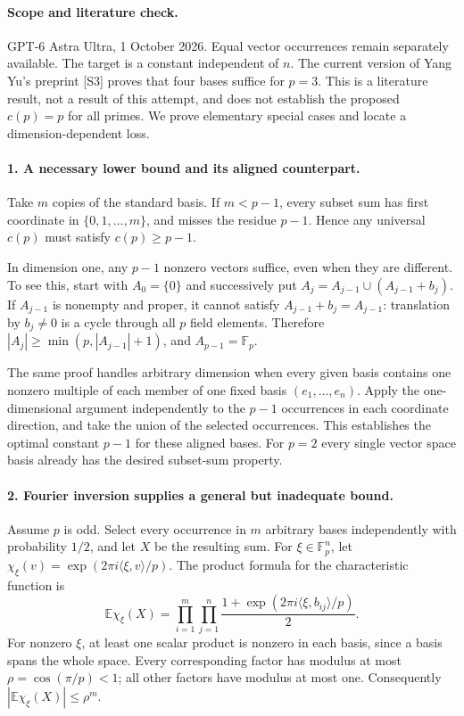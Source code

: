 \documentclass[11pt,a4paper]{article}
\begin{document}
\paragraph{Scope and literature check.}
GPT-6 Astra Ultra, 1 October 2026. Equal vector occurrences remain
separately available. The target is a constant independent of $n$.
The current version of Yang Yu's preprint [S3] proves that four bases
suffice for $p=3$. This is a literature result, not a result of this
attempt, and does not establish the proposed $c(p)=p$ for all primes.
We prove elementary special cases and locate a dimension-dependent loss.

\paragraph{1. A necessary lower bound and its aligned counterpart.}
Take $m$ copies of the standard basis. If $m<p-1$, every subset sum
has first coordinate in $\{0,1,\ldots,m\}$, and misses the residue
$p-1$. Hence any universal $c(p)$ must satisfy $c(p)\ge p-1$.

In dimension one, any $p-1$ nonzero vectors suffice, even when they
are different. To see this, start with $A_0=\{0\}$ and successively
put $A_j=A_{j-1}\cup(A_{j-1}+b_j)$. If $A_{j-1}$ is nonempty and
proper, it cannot satisfy $A_{j-1}+b_j=A_{j-1}$: translation by
$b_j\ne0$ is a cycle through all $p$ field elements. Therefore
$|A_j|\ge\min(p,|A_{j-1}|+1)$, and $A_{p-1}=\mathbb F_p$.

The same proof handles arbitrary dimension when every given basis
contains one nonzero multiple of each member of one fixed basis
$(e_1,\ldots,e_n)$. Apply the one-dimensional argument independently
to the $p-1$ occurrences in each coordinate direction, and take the
union of the selected occurrences. This establishes the optimal
constant $p-1$ for these aligned bases. For $p=2$ every single vector
space basis already has the desired subset-sum property.

\paragraph{2. Fourier inversion supplies a general but inadequate bound.}
Assume $p$ is odd. Select every occurrence in $m$ arbitrary bases
independently with probability $1/2$, and let $X$ be the resulting sum.
For $\xi\in\mathbb F_p^n$, let
$\chi_\xi(v)=\exp(2\pi i\langle\xi,v\rangle/p)$.
The product formula for the characteristic function is
\[
 \mathbb E\chi_\xi(X)=
 \prod_{i=1}^m\prod_{j=1}^n
 \frac{1+\exp(2\pi i\langle\xi,b_{ij}\rangle/p)}2.
\]
For nonzero $\xi$, at least one scalar product is nonzero in each
basis, since a basis spans the whole space. Every corresponding factor
has modulus at most $\rho=\cos(\pi/p)<1$; all other factors have
modulus at most one. Consequently
$|\mathbb E\chi_\xi(X)|\le\rho^m$.
\end{document}
